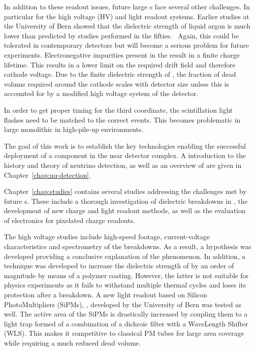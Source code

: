 In addition to these readout issues, future large \lartpc{}s face several other challenges.
In particular for the high voltage (HV) and light readout systems.
Earlier studies at the University of Bern showed that the dielectric strength of liquid argon is much lower than predicted by studies performed in the fifties.~\cite{breakdown_14, swan1, swan2}
Again, this could be tolerated in contemporary detectors but will become a serious problem for future experiments.
Electronegative impurities present in the \lar{} result in a finite charge lifetime.
This results in a lower limit on the required drift field and therefore cathode voltage.
Due to the finite dielectric strength of \lar{}, the fraction of dead volume required around the cathode scales with detector size unless this is accounted for by a modified high voltage system of the detector.

In order to get proper timing for the third coordinate, the scintillation light flashes need to be matched to the correct events.
This becomes problematic in large monolithic \lartpc{} in high-pile-up environments.

The goal of this work is to establish the key technologies enabling the successful deployment of a \lartpc{} component in the \dune{} near detector complex.
A introduction to the history and theory of neutrino detection, as well as an overview of \dune{} are given in Chapter~\ref{chap:nu-detection}.

Chapter~\ref{chap:studies} contains several studies addressing the challenges met by future \lartpc{}s.
These include a thorough investigation of dielectric breakdowns in \lar{}, the development of new charge and light readout methods, as well as the evaluation of electronics for pixelated charge readouts.

The high voltage studies include high-speed footage, current-voltage characteristics and spectrometry of the breakdowns.
As a result, a hypothesis was developed providing a conclusive explanation of the phenomenon.
In addition, a technique was developed to increase the dielectric strength of \lar{} by an order of magnitude by means of a polymer coating.
However, the latter is not suitable for physics experiments as it fails to withstand multiple thermal cycles and loses its protection after a breakdown.
A new light readout based on Silicon PhotoMultipliers (SiPMs), \AL{}, developed by the University of Bern was tested as well.
The active area of the SiPMs is drastically increased by coupling them to a light trap formed of a combination of a dichroic filter with a WaveLength Shifter (WLS).
This makes it competitive to classical PM tubes for large area coverage while requiring a much reduced dead volume.

